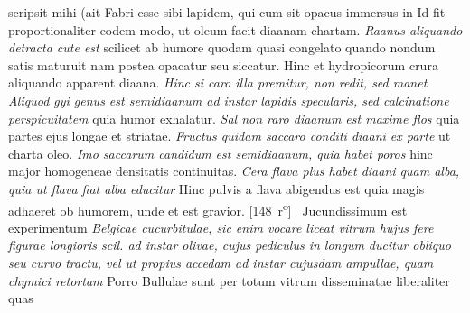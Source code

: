 scripsit mihi (ait Fabri  esse sibi lapidem, qui cum sit opacus immersus in   Id fit proportionaliter eodem modo, ut oleum\protect{} facit diaanam chartam. \textit{Raanus aliquando detracta cute est } scilicet ab humore\protect{} quodam quasi congelato quando nondum satis maturuit nam postea opacatur seu siccatur. Hinc et hydropicorum crura aliquando apparent diaana.
\textit{Hinc si caro\protect{} illa premitur, non redit, sed manet  Aliquod gyi\protect{} genus est semidiaanum ad instar lapidis specularis, sed calcinatione\protect{} perspicuitatem } quia humor exhalatur. \textit{Sal non raro diaanum est maxime flos } quia partes ejus longae et striatae.
\textit{Fructus quidam saccaro conditi diaani ex parte } ut charta oleo. \textit{Imo saccarum candidum est semidiaanum, quia habet poros } hinc major homogeneae densitatis\protect{} continuitas. \textit{Cera flava\protect{} plus habet diaani quam alba\protect{}, quia ut flava fiat alba educitur } Hinc pulvis a flava abigendus est quia magis adhaeret ob humorem, unde et est gravior.
[148~r\textsuperscript{o}]
\pend%
\pstart%
%
%
%
% 
%
 \, Jucundissimum est experimentum \textit{Belgicae cucurbitulae\protect{}, sic enim vocare liceat  vitrum hujus fere figurae longioris scil. ad instar olivae, cujus pediculus in longum ducitur obliquo seu curvo tractu, vel ut propius accedam ad instar cujusdam ampullae, quam chymici retortam\protect{} } Porro Bullulae sunt per totum vitrum disseminatae liberaliter quas
